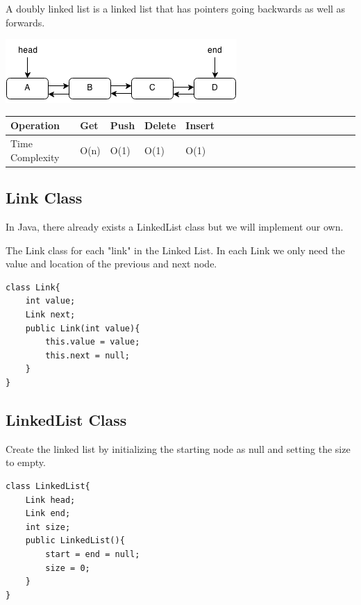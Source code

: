 \documentclass[11pt,oneside]{book}
\makeatletter
\def\maxwidth#1{\ifdim\Gin@nat@width>#1 #1\else\Gin@nat@width\fi}
\makeatother
\begin{document}
A doubly linked list is a linked list that has pointers going backwards as well as forwards.

\vspace{5px}\includegraphics[width=\maxwidth{\textwidth}]{doublelinkedlist.png}

\vspace{10px}\begin{tabulary}{0.4\linewidth}{|l|l|l|l|l|l|l|l|l|l|l|l|l|l|l|l|l|l|l}\hline


  Operation &
  Get &
  Push &
  Delete &
  Insert\\
\hline


  Time Complexity &
  O(n) &
  O(1) &
  O(1) &
  O(1)\\

\hline\end{tabulary}

\subsection{Link Class}

In Java, there already exists a LinkedList class but we will implement our own.

The Link class for each "link" in the Linked List. In each Link we only need the value and location of the previous and next node.

\begin{lstlisting}
class Link{
    int value;
    Link next;
    public Link(int value){
        this.value = value;
        this.next = null;
    }
}
\end{lstlisting}

\subsection{LinkedList Class}

Create the linked list by initializing the starting node as null and setting the size to empty.

\begin{lstlisting}
class LinkedList{
    Link head;
    Link end;
    int size;
    public LinkedList(){
        start = end = null;
        size = 0;
    }
}
\end{lstlisting}
\end{document}

